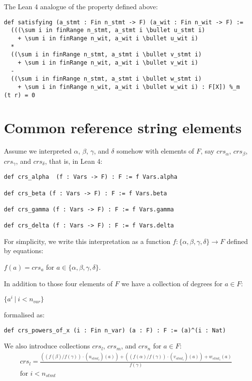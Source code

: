 \documentclass{article}
\theoremstyle{definition}
\theoremstyle{remark}
\begin{document}
The Lean 4 analogue of the property defined above:
\begin{lstlisting}
def satisfying (a_stmt : Fin n_stmt -> F) (a_wit : Fin n_wit -> F) :=
  (((\sum i in finRange n_stmt, a_stmt i \bullet u_stmt i)
    + \sum i in finRange n_wit, a_wit i \bullet u_wit i)
  *
  ((\sum i in finRange n_stmt, a_stmt i \bullet v_stmt i)
    + \sum i in finRange n_wit, a_wit i \bullet v_wit i)
  -
  ((\sum i in finRange n_stmt, a_stmt i \bullet w_stmt i)
    + \sum i in finRange n_wit, a_wit i \bullet w_wit i) : F[X]) %_m (t r) = 0
\end{lstlisting}

\section{Common reference string elements}

Assume we interpreted $\alpha$, $\beta$, $\gamma$, and $\delta$ somehow with elements of $F$, say $crs_{\alpha}$, $crs_{\beta}$, $crs_{\gamma}$, and $crs_{\delta}$, that is, in Lean 4:

\begin{lstlisting}
def crs_alpha  (f : Vars -> F) : F := f Vars.alpha

def crs_beta (f : Vars -> F) : F := f Vars.beta

def crs_gamma (f : Vars -> F) : F := f Vars.gamma

def crs_delta (f : Vars -> F) : F := f Vars.delta
\end{lstlisting}

For simplicity, we write this interpretation as a function $f :  \{ \alpha,\beta,\gamma, \delta \} \to F$ defined by equations:
\begin{center}
$f(a) = crs_{a}$ for $a \in \{ \alpha,\beta,\gamma, \delta \}$.
\end{center}

In addition to those four elements of $F$ we have a collection of degrees for $a \in F$:
\begin{center}
$\{ a^i \: | \: i < n_{var} \}$
\end{center}
formalised as:
\begin{lstlisting}
def crs_powers_of_x (i : Fin n_var) (a : F) : F := (a)^(i : Nat)
\end{lstlisting}

We also introduce collections $crs_l$, $crs_m$, and $crs_n$ for $a \in F$:
\begin{multline}
crs_l = \frac{((f(\beta) / f(\gamma)) \cdot (u_{{stmt}_i})(a)) + ((f(\alpha) / f(\gamma)) \cdot (v_{{stmt}_i})(a)) + w_{{stmt}_i}(a)}{f(\gamma)} \\ \text{for $i < n_{stmt}$}
\end{multline}
\end{document}
